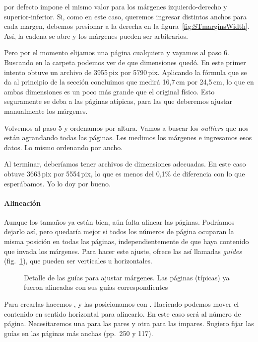 \documentclass[%
	a5paper,
	10pt,
	twoside,
	openright,
	final,
]{memoir}
\begin{document}
	\scantailor por defecto impone el mismo valor para los márgenes izquierdo-derecho y superior-inferior. Si, como en este caso, queremos ingresar distintos anchos para cada margen, debemos presionar \keys{\faLink} a la derecha en la figura~\ref{fig:STmarginsWidth}. Así, la cadena se abre \keys{\faUnlink} y los márgenes pueden ser arbitrarios.

	Pero por el momento elijamos una página cualquiera y vayamos al paso 6. Buscando en la carpeta  podemos ver de que dimensiones quedó. En este primer intento obtuve un archivo de 3955\,pix por 5790\,pix. Aplicando la fórmula que se da al principio de la sección concluimos que medirá 16,7\,cm por 24,5\,cm, lo que en ambas dimensiones es un poco más grande que el original físico. Esto seguramente se deba a las páginas atípicas, para las que deberemos ajustar manualmente los márgenes.

	Volvemos al paso 5 y ordenamos por altura. Vamos a buscar los \emph{outliers} que nos están agrandando todas las páginas. Les medimos los márgenes e ingresamos esos datos. Lo mismo ordenando por ancho.

	Al terminar, deberíamos tener archivos de dimensiones adecuadas. En este caso obtuve 3663\,pix por 5554\,pix, lo que es menos del 0,1\% de diferencia con lo que esperábamos. Yo lo doy por bueno.

	\paragraph{Alineación} Aunque los tamaños ya están bien, aún falta alinear las páginas. Podríamos dejarlo así, pero quedaría mejor si todos los números de página ocuparan la misma posición en todas las páginas, independientemente de que haya contenido que invada los márgenes. Para hacer este ajuste, \scantailorAdvanced ofrece las así llamadas \emph{guides} (fig.~\ref{fig:STmarginsGuides}), que pueden ser verticales u horizontales.

	\begin{figure}
		\tiny
		\def\svgwidth{\linewidth}
		\def\svgwidth{\linewidth}
		\caption[Detalle de las guías para ajustar márgenes]{Detalle de las guías para ajustar márgenes. Las páginas (típicas) ya fueron alineadas con sus guías correspondientes\label{fig:STmarginsGuides}}
	\end{figure}

	Para crearlas hacemos , y las posicionamos con . Haciendo  podemos mover el contenido en sentido horizontal para alinearlo. En este caso será al número de página. Necesitaremos una para las pares y otra para las impares. Sugiero fijar las guías en las páginas más anchas (pp.~250 y 117).
\end{document}
